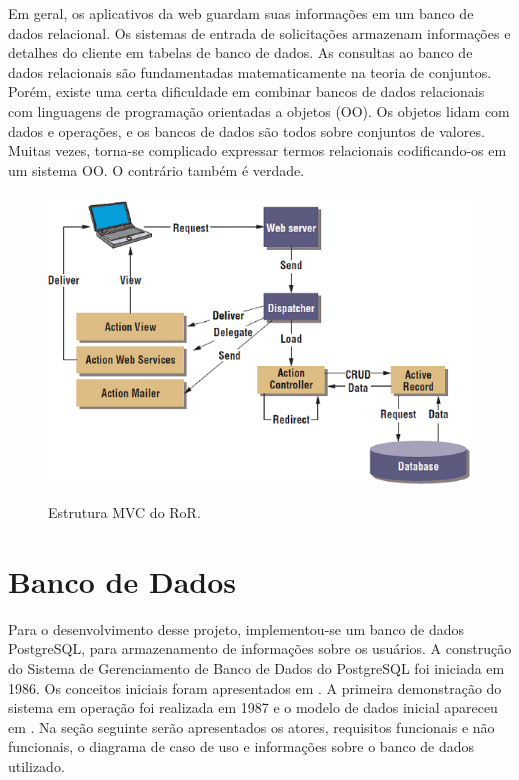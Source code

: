 Em geral, os aplicativos da web guardam suas informações em um banco de dados relacional. Os sistemas de entrada de solicitações armazenam informações e detalhes do cliente em tabelas de banco de dados. As consultas ao banco de dados relacionais são fundamentadas matematicamente na  teoria de conjuntos. Porém, existe uma certa dificuldade em combinar bancos de dados relacionais com linguagens de programação orientadas a objetos (OO).
Os objetos lidam com dados e operações, e os bancos de dados são todos sobre conjuntos de valores. Muitas vezes, torna-se complicado expressar termos relacionais  codificando-os em um sistema OO. O contrário também é verdade. 

\begin{figure}[h]
	\caption{Estrutura MVC do RoR.}
	
	\centering %
	\includegraphics{Figs/frameworkRuby.png} %
	\label{figura:frameworkRuby}
\end{figure}
\section{Banco de Dados}

Para o desenvolvimento desse projeto, implementou-se um banco
de dados PostgreSQL, para armazenamento de informações sobre os usuários. A construção do Sistema de Gerenciamento de Banco de Dados do PostgreSQL foi iniciada em
1986. Os conceitos iniciais foram apresentados em \cite{stonebraker1986design}.  A primeira demonstração do sistema em operação foi realizada em 1987 e
o modelo de dados inicial apareceu em
\cite{stonebraker1988design}. 
Na seção seguinte serão apresentados os atores, requisitos funcionais e não funcionais, o diagrama de caso de uso e informações sobre o banco de dados utilizado.

